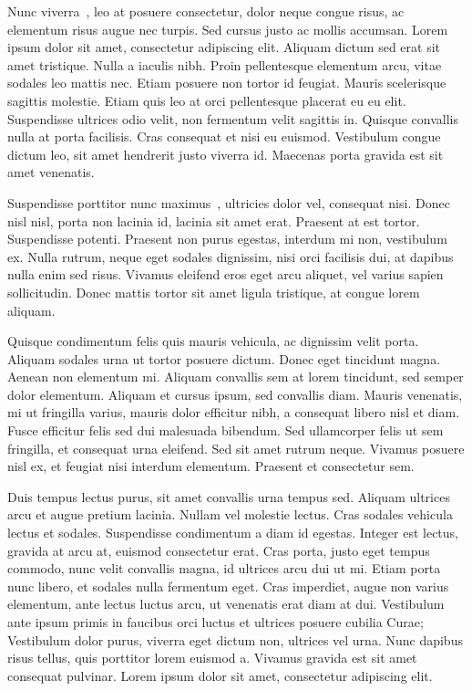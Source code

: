\documentclass[pdftex, brazil, 12pt, twoside]{article}
\begin{document}
Nunc viverra~\citep{Cormen2009}, leo at posuere consectetur, dolor neque congue risus, ac elementum risus augue nec turpis. Sed cursus justo ac mollis accumsan. Lorem ipsum dolor sit amet, consectetur adipiscing elit. Aliquam dictum sed erat sit amet tristique. Nulla a iaculis nibh. Proin pellentesque elementum arcu, vitae sodales leo mattis nec. Etiam posuere non tortor id feugiat. Mauris scelerisque sagittis molestie. Etiam quis leo at orci pellentesque placerat eu eu elit. Suspendisse ultrices odio velit, non fermentum velit sagittis in. Quisque convallis nulla at porta facilisis. Cras consequat et nisi eu euismod. Vestibulum congue dictum leo, sit amet hendrerit justo viverra id. Maecenas porta gravida est sit amet venenatis.

Suspendisse porttitor nunc maximus~\citep{FitzgeraldShiloh2013}, ultricies dolor vel, consequat nisi. Donec nisl nisl, porta non lacinia id, lacinia sit amet erat. Praesent at est tortor. Suspendisse potenti. Praesent non purus egestas, interdum mi non, vestibulum ex. Nulla rutrum, neque eget sodales dignissim, nisi orci facilisis dui, at dapibus nulla enim sed risus. Vivamus eleifend eros eget arcu aliquet, vel varius sapien sollicitudin. Donec mattis tortor sit amet ligula tristique, at congue lorem aliquam.

Quisque condimentum felis quis mauris vehicula, ac dignissim velit porta. Aliquam sodales urna ut tortor posuere dictum. Donec eget tincidunt magna. Aenean non elementum mi. Aliquam convallis sem at lorem tincidunt, sed semper dolor elementum. Aliquam et cursus ipsum, sed convallis diam. Mauris venenatis, mi ut fringilla varius, mauris dolor efficitur nibh, a consequat libero nisl et diam. Fusce efficitur felis sed dui malesuada bibendum. Sed ullamcorper felis ut sem fringilla, et consequat urna eleifend. Sed sit amet rutrum neque. Vivamus posuere nisl ex, et feugiat nisi interdum elementum. Praesent et consectetur sem.

Duis tempus lectus purus, sit amet convallis urna tempus sed. Aliquam ultrices arcu et augue pretium lacinia. Nullam vel molestie lectus. Cras sodales vehicula lectus et sodales. Suspendisse condimentum a diam id egestas. Integer est lectus, gravida at arcu at, euismod consectetur erat. Cras porta, justo eget tempus commodo, nunc velit convallis magna, id ultrices arcu dui ut mi. Etiam porta nunc libero, et sodales nulla fermentum eget. Cras imperdiet, augue non varius elementum, ante lectus luctus arcu, ut venenatis erat diam at dui. Vestibulum ante ipsum primis in faucibus orci luctus et ultrices posuere cubilia Curae; Vestibulum dolor purus, viverra eget dictum non, ultrices vel urna. Nunc dapibus risus tellus, quis porttitor lorem euismod a. Vivamus gravida est sit amet consequat pulvinar. Lorem ipsum dolor sit amet, consectetur adipiscing elit.
\end{document}
